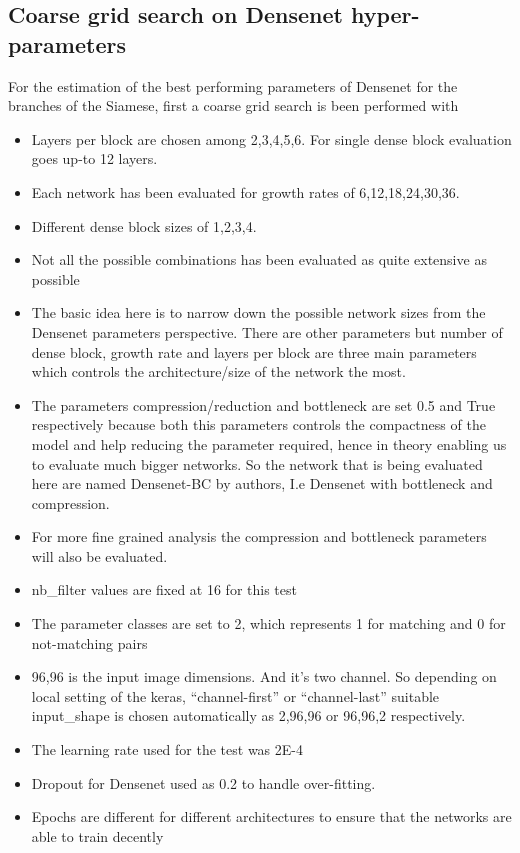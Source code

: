 \subsection{Coarse grid search on Densenet hyper-parameters}
For the estimation of the best performing parameters of Densenet for the branches of the Siamese, first a coarse grid search is been performed with 
\begin{itemize}
 \item Layers per block are chosen among 2,3,4,5,6. For single dense block evaluation goes up-to 12 layers. 
 \item Each network has been evaluated for growth rates of 6,12,18,24,30,36. 
 \item Different dense block sizes of 1,2,3,4.  
 \item Not all the possible combinations has been evaluated as quite extensive as possible
 \item The basic idea here is to narrow down the possible network sizes from the Densenet parameters perspective. There are other parameters but number of dense block, 
 growth rate and layers per block are three main parameters which controls the architecture/size of the network the most.
 \item The parameters compression/reduction and bottleneck are set 0.5 and True respectively because both this parameters controls the compactness of the model and help 
 reducing the parameter required, hence in theory enabling us to evaluate much bigger networks. So the network that is being evaluated here are named Densenet-BC by authors, 
 I.e Densenet with bottleneck and compression.
 \item For more fine grained analysis the compression and bottleneck parameters will also be evaluated. 
 \item nb\_filter values are fixed at 16 for this test
 \item The parameter classes are set to 2, which represents 1 for matching and 0 for not-matching pairs
 \item 96,96 is the input image dimensions. And it’s two channel. So depending on local setting of the keras, “channel-first” or “channel-last” suitable input\_shape is 
 chosen automatically as  2,96,96  or 96,96,2 respectively.
 \item The learning rate used for the test was 2E-4
 \item Dropout for Densenet used as 0.2 to handle over-fitting.  
 \item Epochs are different for different architectures to ensure that the networks are able to train decently %

\end{itemize}
